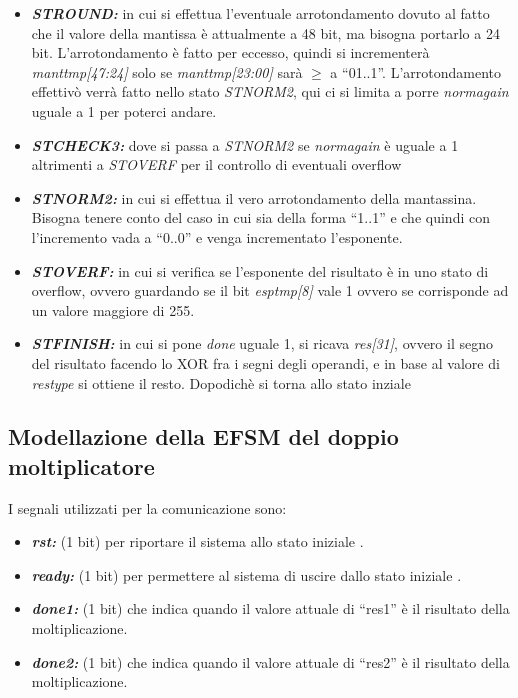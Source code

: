 \documentclass[]{IEEEtran}
\begin{document}
\begin{itemize}
\item {\it\bf ST\textunderscore ROUND:} in cui si effettua l'eventuale arrotondamento dovuto al fatto che il valore della mantissa è attualmente a 48 bit, ma bisogna portarlo a 24 bit. L'arrotondamento è fatto per eccesso, quindi si incrementerà {\it mant\textunderscore tmp[47:24]} solo se {\it mant\textunderscore tmp[23:00]} sarà \( \geq \) a ``01..1''. L'arrotondamento effettivò verrà fatto nello stato {\it ST\textunderscore NORM2}, qui ci si limita a porre {\it norm\textunderscore again} uguale a 1 per poterci andare.
\item {\it\bf ST\textunderscore CHECK3:} dove si passa a {\it ST\textunderscore NORM2} se {\it norm\textunderscore again} è uguale a 1 altrimenti a {\it ST\textunderscore OVERF} per il controllo di eventuali overflow
\item {\it\bf ST\textunderscore NORM2:} in cui si effettua il vero arrotondamento della mantassina. Bisogna tenere conto del caso in cui sia della forma ``1..1'' e che quindi con l'incremento vada a ``0..0'' e  venga incrementato l'esponente.
\item {\it\bf ST\textunderscore OVERF:} in cui si verifica se l'esponente del risultato è in uno stato di overflow, ovvero guardando se il bit {\it esp\textunderscore tmp[8]} vale 1 ovvero se corrisponde ad un valore maggiore di 255.
\item {\it\bf ST\textunderscore FINISH:} in cui si pone {\it done} uguale 1, si ricava {\it res[31]}, ovvero il segno del risultato facendo lo XOR fra i segni degli operandi, e in base al valore di {\it res\textunderscore type} si ottiene il resto. Dopodichè si torna allo stato inziale
\end{itemize}


\subsection{Modellazione della EFSM del doppio moltiplicatore}
I segnali utilizzati per la comunicazione sono:
\begin{itemize}
\item {\it\bf rst:} (1 bit) per riportare il sistema allo stato iniziale .
\item {\it\bf ready:} (1 bit) per permettere al sistema di uscire dallo stato iniziale .
\item {\it\bf done1:} (1 bit) che indica quando il valore attuale di ``res1'' è il risultato della moltiplicazione.
\item {\it\bf done2:} (1 bit) che indica quando il valore attuale di ``res2'' è il risultato della moltiplicazione.
\end{itemize}
\end{document}
